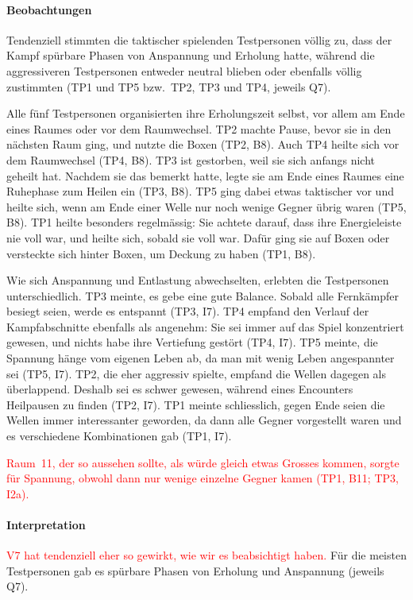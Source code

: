 \documentclass[../Main.tex]{subfiles}
\begin{document}
\paragraph{Beobachtungen}
Tendenziell stimmten die taktischer spielenden Testpersonen völlig zu, dass der Kampf spürbare Phasen von Anspannung und Erholung hatte, während die aggressiveren Testpersonen entweder neutral blieben oder ebenfalls völlig zustimmten (TP1 und TP5 bzw.\ TP2, TP3 und TP4, jeweils Q7).

Alle fünf Testpersonen organisierten ihre Erholungszeit selbst, vor allem am Ende eines Raumes oder vor dem Raumwechsel. TP2 machte Pause, bevor sie in den nächsten Raum ging, und nutzte die Boxen (TP2, B8). Auch TP4 heilte sich vor dem Raumwechsel (TP4, B8). TP3 ist gestorben, weil sie sich anfangs nicht geheilt hat. Nachdem sie das bemerkt hatte, legte sie am Ende eines Raumes eine Ruhephase zum Heilen ein (TP3, B8). TP5 ging dabei etwas taktischer vor und heilte sich, wenn am Ende einer Welle nur noch wenige Gegner übrig waren (TP5, B8). TP1 heilte besonders regelmässig: Sie achtete darauf, dass ihre Energieleiste nie voll war, und heilte sich, sobald sie voll war. Dafür ging sie auf Boxen oder versteckte sich hinter Boxen, um Deckung zu haben (TP1, B8).

Wie sich Anspannung und Entlastung abwechselten, erlebten die Testpersonen unterschiedlich. TP3 meinte, es gebe eine gute Balance. Sobald alle Fernkämpfer besiegt seien, werde es entspannt (TP3, I7). TP4 empfand den Verlauf der Kampfabschnitte ebenfalls als angenehm: Sie sei immer auf das Spiel konzentriert gewesen, und nichts habe ihre Vertiefung gestört (TP4, I7). TP5 meinte, die Spannung hänge vom eigenen Leben ab, da man mit wenig Leben angespannter sei (TP5, I7). TP2, die eher aggressiv spielte, empfand die Wellen dagegen als überlappend. Deshalb sei es schwer gewesen, während eines Encounters Heilpausen zu finden (TP2, I7). TP1 meinte schliesslich, gegen Ende seien die Wellen immer interessanter geworden, da dann alle Gegner vorgestellt waren und es verschiedene Kombinationen gab (TP1, I7).

\textcolor{red}{Raum~11, der so aussehen sollte, als würde gleich etwas Grosses kommen, sorgte für Spannung, obwohl dann nur wenige einzelne Gegner kamen (TP1, B11; TP3, I2a).}

\paragraph{Interpretation}
\textcolor{red}{V7 hat tendenziell eher so gewirkt, wie wir es beabsichtigt haben.} Für die meisten Testpersonen gab es spürbare Phasen von Erholung und Anspannung (jeweils Q7).
\end{document}
